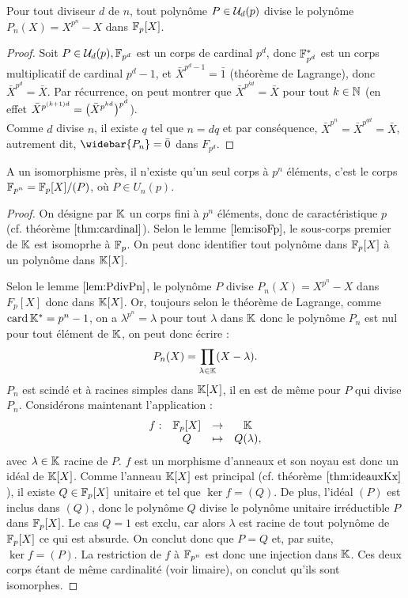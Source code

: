 \begin{lem}
\label{lem:PdivPn}
Pour tout diviseur $d$ de $n$, tout polynôme $P \in \mathcal{U}_d(p)$ divise le polynôme $P_n(X) = X^{p^n} - X$ dans $\mathbb{F}_p[X]$.
\end{lem}

\begin{proof}
Soit $P \in \mathcal{U}_d(p), \mathbb{F}_{p^d}$ est un corps de cardinal $p^d$, donc $\mathbb{F}_{p^d}^{\ast}$ est un corps multiplicatif de cardinal $p^d-1$,
et $\bar{X}^{p^d-1} = \bar{1}$ (théorème de Lagrange), donc $\bar{X}^{p^d} = \bar{X}$. Par récurrence, on peut montrer que 
$\bar{X}^{p^{kd}} = \bar{X}$ pour tout $k \in \mathbb{N}$ (en effet $\bar{X}^{p^{(k+1)d}} = \bigl(  \bar{X}^{p^{kd}}  \bigr)^{p^d}$). \\
Comme $d$ divise $n$, il existe $q$ tel que $n=dq$ et par conséquence, $\bar{X}^{p^n} = \bar{X}^{p^{qd}} = \bar{X}$, 
autrement dit, $\widebar{P_n} = \bar{0}$ dans $F_{p^d}$.
\end{proof}

\begin{thm}
A un isomorphisme près, il n'existe qu'un seul corps à $p^n$ éléments, c'est le corps $\mathbb{F}_{p^n} = \mathbb{F}_p[X] / (P)$,
où $P \in U_n(p)$.
\end{thm}

\begin{proof}
On désigne par $\mathbb{K}$ un corps fini à $p^n$ éléments, donc de caractéristique $p$ (cf. théorème $\ref{thm:cardinal}$).
Selon le lemme $\ref{lem:isoFp}$, le sous-corps premier de $\mathbb{K}$ est isomoprhe à $\mathbb{F}_p$. 
On peut donc identifier tout polynôme dans $\mathbb{F}_p[X]$ à un polynôme dans $\mathbb{K}[X]$. \newline

Selon le lemme $\ref{lem:PdivPn}$, le polynôme $P$ divise $P_n(X) = X^{p^n} - X$ dans $F_p[X]$ donc dans $\mathbb{K}[X]$. 
Or, toujours selon le théorème de Lagrange, comme $\operatorname{card}{\mathbb{K^{\ast}}} = p^n-1$, on a $\lambda^{p^n} = \lambda$ 
pour tout $\lambda$ dans $\mathbb{K}$ donc  le polynôme $P_n$ est nul pour tout élément de $\mathbb{K}$, on peut donc écrire :
\[ P_n(X) = \prod_{\lambda \in \mathbb{K}} (X - \lambda) . \]
$P_n$ est scindé et à racines simples dans $\mathbb{K}[X]$, il en est de même pour $P$ qui divise $P_n$.
Considérons maintenant l'application :
\[ \begin{array}{c c c c}
f : & \mathbb{F}_p[X] & \to & \mathbb{K} \\
& Q & \mapsto & Q(\lambda) , 
\end{array} \]
avec $\lambda \in \mathbb{K}$ racine de $P$. $f$ est un morphisme d'anneaux et son noyau est donc un idéal de $\mathbb{K}[X]$.
Comme l'anneau $\mathbb{K}[X]$ est principal (cf. théorème $\ref{thm:ideauxKx}$), il existe $Q \in \mathbb{F}_p[X]$ unitaire et tel que $\ker{f} = (Q)$.
De plus, l'idéal $(P)$ est inclus dans $(Q)$, donc le polynôme $Q$ divise le polynôme unitaire irréductible $P$ dans $\mathbb{F}_p[X]$.
Le cas $Q=1$ est exclu, car alors $\lambda$ est racine de tout polynôme de $\mathbb{F}_p[X]$ ce qui est absurde. 
On conclut donc que $P=Q$ et, par suite, $\ker{f} = (P)$. La restriction de $f$ à $\mathbb{F}_{p^n}$ est donc une injection dans $\mathbb{K}$.
Ces deux corps étant de même cardinalité (voir limaire), on conclut qu'ils sont isomorphes.
\end{proof}

